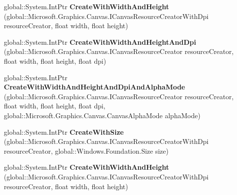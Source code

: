 \begin{DoxyCompactItemize}
global\+::\+System.\+Int\+Ptr {\bfseries Create\+With\+Width\+And\+Height} (global\+::\+Microsoft.\+Graphics.\+Canvas.\+I\+Canvas\+Resource\+Creator\+With\+Dpi resource\+Creator, float width, float height)
\item 
\mbox{\label{interface_microsoft_1_1_graphics_1_1_canvas_1_1_u_i_1_1_xaml_1_1_i_canvas_virtual_image_source_factory_a8dec48ae093e81783bc8f960229a0cd0}} 
global\+::\+System.\+Int\+Ptr {\bfseries Create\+With\+Width\+And\+Height\+And\+Dpi} (global\+::\+Microsoft.\+Graphics.\+Canvas.\+I\+Canvas\+Resource\+Creator resource\+Creator, float width, float height, float dpi)
\item 
\mbox{\label{interface_microsoft_1_1_graphics_1_1_canvas_1_1_u_i_1_1_xaml_1_1_i_canvas_virtual_image_source_factory_ac23a6e94d90c7e30a156e1261f94f38c}} 
global\+::\+System.\+Int\+Ptr {\bfseries Create\+With\+Width\+And\+Height\+And\+Dpi\+And\+Alpha\+Mode} (global\+::\+Microsoft.\+Graphics.\+Canvas.\+I\+Canvas\+Resource\+Creator resource\+Creator, float width, float height, float dpi, global\+::\+Microsoft.\+Graphics.\+Canvas.\+Canvas\+Alpha\+Mode alpha\+Mode)
\item 
\mbox{\label{interface_microsoft_1_1_graphics_1_1_canvas_1_1_u_i_1_1_xaml_1_1_i_canvas_virtual_image_source_factory_a6ef2ceb8efc3356922c19a0c886c01a9}} 
global\+::\+System.\+Int\+Ptr {\bfseries Create\+With\+Size} (global\+::\+Microsoft.\+Graphics.\+Canvas.\+I\+Canvas\+Resource\+Creator\+With\+Dpi resource\+Creator, global\+::\+Windows.\+Foundation.\+Size size)
\item 
\mbox{\label{interface_microsoft_1_1_graphics_1_1_canvas_1_1_u_i_1_1_xaml_1_1_i_canvas_virtual_image_source_factory_a5ce3deeb7f455cd4077cd79f1a73628d}} 
global\+::\+System.\+Int\+Ptr {\bfseries Create\+With\+Width\+And\+Height} (global\+::\+Microsoft.\+Graphics.\+Canvas.\+I\+Canvas\+Resource\+Creator\+With\+Dpi resource\+Creator, float width, float height)
\item 
\mbox{\label{interface_microsoft_1_1_graphics_1_1_canvas_1_1_u_i_1_1_xaml_1_1_i_canvas_virtual_image_source_factory_a8dec48ae093e81783bc8f960229a0cd0}} 

\end{DoxyCompactItemize}
